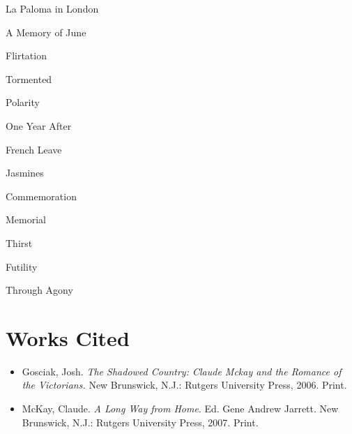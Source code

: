 \documentclass[
  12pt,
]{article}
\begin{document}
La Paloma in London

A Memory of June

Flirtation

Tormented

Polarity

One Year After

French Leave

Jasmines

Commemoration

Memorial

Thirst

Futility

Through Agony

\hypertarget{works-cited}{%
\section{Works Cited}\label{works-cited}}

\begin{itemize}
\item
  Gosciak, Josh. \emph{The Shadowed Country: Claude Mckay and the
  Romance of the Victorians.} New Brunswick, N.J.: Rutgers University
  Press, 2006. Print.
\item
  McKay, Claude. \emph{A Long Way from Home}. Ed. Gene Andrew Jarrett.
  New Brunswick, N.J.: Rutgers University Press, 2007. Print.
\end{itemize}
\end{document}
